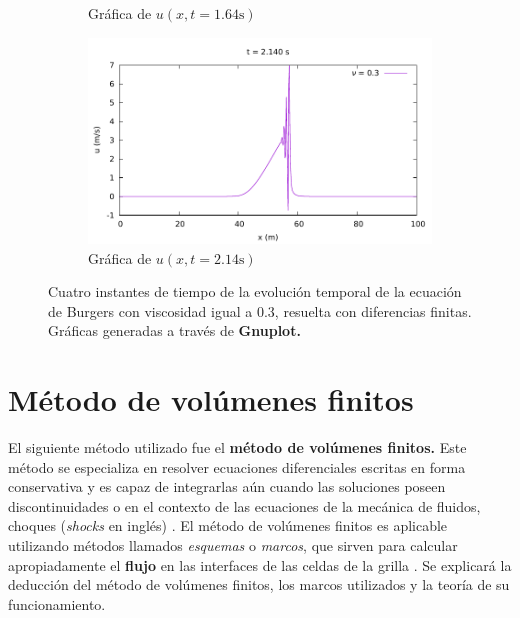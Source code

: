 \documentclass[12pt]{article}
\begin{document}
\begin{figure}[ht]
\begin{subfigure}[b]{0.4\textwidth}
			\caption*{Gráfica de $u(x,t=1.64\unit{\second})$}
			\label{fig:vis0.3-3}
		\end{subfigure}
		\hfill
		\begin{subfigure}[b]{0.4\textwidth}
			\includegraphics[width=\textwidth]{../burg-vis1DDF/results/frames0.3/frame107.pdf}
			\caption*{Gráfica de $u(x,t=2.14\unit{\second})$}
			\label{fig:vis0.3-4}
		\end{subfigure}
		\caption{Cuatro instantes de tiempo de la evolución temporal de la ecuación de Burgers con viscosidad igual a $0.3$, resuelta con diferencias finitas. Gráficas generadas a través de \textbf{Gnuplot.}}
		\label{fig:instantes-nu0.3}
	\end{figure}

	\theoremstyle{definition}
	\newtheorem{definition}{Definición}[section]
	\clearpage
	\section{Método de volúmenes finitos}
	El siguiente método utilizado fue el \textbf{método de volúmenes finitos.} Este método se especializa en resolver ecuaciones diferenciales escritas en forma conservativa y es capaz de integrarlas aún cuando las soluciones poseen discontinuidades o  en el contexto de las ecuaciones de la mecánica de fluidos, choques (\textit{shocks} en inglés) \cite{LeVeque1998}. El método de volúmenes finitos es aplicable utilizando métodos llamados \textit{esquemas} o \textit{marcos}, que sirven para calcular apropiadamente el \textbf{flujo} en las interfaces de las celdas de la grilla \cite{LeVeque1998}. Se explicará la deducción del método de volúmenes finitos, los marcos utilizados y la teoría de su funcionamiento.
	
\end{document}
